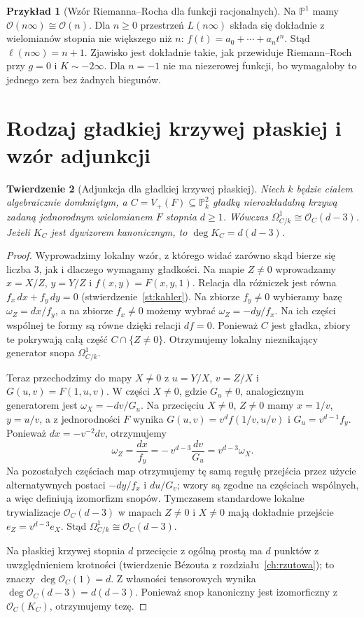 \documentclass[11pt,a4paper,openany]{report}
\numberwithin{equation}{section}
\theoremstyle{plain}
\newtheorem{twierdzenie}{Twierdzenie}[section]
\theoremstyle{definition}
\newtheorem{przyklad}[twierdzenie]{Przykład}
\theoremstyle{remark}
\newcommand{\PP}{\mathbb P}
\begin{document}
\begin{przyklad}[Wzór Riemanna--Rocha dla funkcji racjonalnych]
Na $\PP^1$ mamy $\mathcal O(n\infty)\cong\mathcal O(n)$.
Dla $n\ge0$ przestrzeń $L(n\infty)$ składa się
dokładnie z wielomianów stopnia nie większego niż $n$:
$f(t)=a_0+\cdots+a_nt^n$. Stąd $\ell(n\infty)=n+1$.
Zjawisko jest dokładnie takie, jak przewiduje Riemann--Roch
przy $g=0$ i $K\sim-2\infty$.
Dla $n=-1$ nie ma niezerowej funkcji, bo wymagałoby
to jednego zera bez żadnych biegunów.
\end{przyklad}

\section{Rodzaj gładkiej krzywej płaskiej i wzór adjunkcji}
\label{sec:genus-plane}

\begin{twierdzenie}[Adjunkcja dla gładkiej krzywej płaskiej]
\label{tw:adjunction-plane}
Niech $k$ będzie ciałem algebraicznie domkniętym,
a $C=V_+(F)\subseteq\PP^2_k$ gładką nierozkładalną
krzywą zadaną jednorodnym wielomianem $F$
stopnia $d\ge1$. Wówczas
$\Omega^1_{C/k}\cong\mathcal O_C(d-3)$.
Jeżeli $K_C$ jest dywizorem kanonicznym,
to $\deg K_C=d(d-3)$.
\end{twierdzenie}
\begin{proof}
Wyprowadzimy lokalny wzór, z którego widać
zarówno skąd bierze się liczba $3$, jak i dlaczego
wymagamy gładkości. Na mapie $Z\ne0$ wprowadzamy
$x=X/Z$, $y=Y/Z$ i $f(x,y)=F(x,y,1)$.
Relacja dla różniczek jest równa
$f_x\,dx+f_y\,dy=0$ (stwierdzenie~\ref{st:kahler}).
Na zbiorze $f_y\ne0$ wybieramy bazę
$\omega_Z=dx/f_y$, a na zbiorze $f_x\ne0$
możemy wybrać $\omega_Z=-dy/f_x$.
Na ich części wspólnej te formy są równe
dzięki relacji $df=0$. Ponieważ $C$ jest gładka,
zbiory te pokrywają całą część $C\cap\{Z\ne0\}$.
Otrzymujemy lokalny nieznikający generator
snopa $\Omega^1_{C/k}$.

Teraz przechodzimy do mapy $X\ne0$ z
$u=Y/X$, $v=Z/X$ i $G(u,v)=F(1,u,v)$.
W części $X\ne0$, gdzie $G_u\ne0$,
analogicznym generatorem jest $\omega_X=-dv/G_u$.
Na przecięciu $X\ne0$, $Z\ne0$ mamy
$x=1/v$, $y=u/v$, a z jednorodności $F$ wynika
$G(u,v)=v^d f(1/v,u/v)$ i
$G_u=v^{d-1}f_y$.
Ponieważ $dx=-v^{-2}dv$, otrzymujemy
\[
 \omega_Z=\frac{dx}{f_y}
   =-\,v^{d-3}\frac{dv}{G_u}
   =v^{d-3}\omega_X.
\]
Na pozostałych częściach map otrzymujemy tę samą
regułę przejścia przez użycie alternatywnych
postaci $-dy/f_x$ i $du/G_v$; wzory są zgodne
na częściach wspólnych, a więc definiują
izomorfizm snopów. Tymczasem standardowe lokalne
trywializacje $\mathcal O_C(d-3)$ w mapach
$Z\ne0$ i $X\ne0$ mają dokładnie przejście
$e_Z=v^{d-3}e_X$. Stąd
$\Omega^1_{C/k}\cong\mathcal O_C(d-3)$.

Na płaskiej krzywej stopnia $d$ przecięcie
z ogólną prostą ma $d$ punktów z uwzględnieniem
krotności (twierdzenie Bézouta z
rozdziału~\ref{ch:rzutowa}); to znaczy
$\deg\mathcal O_C(1)=d$. Z własności tensorowych
wynika $\deg\mathcal O_C(d-3)=d(d-3)$.
Ponieważ snop kanoniczny jest izomorficzny
z $\mathcal O_C(K_C)$, otrzymujemy tezę.
\end{proof}
\end{document}
